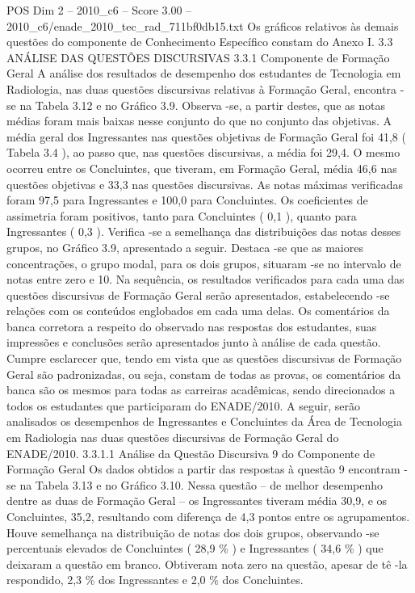 \begin{textsample}{POS Dim 2 – 2010\_c6 – Score 3.00 – 2010\_c6/enade\_2010\_tec\_rad\_711bf0db15.txt}
Os gráficos relativos às demais questões do componente de Conhecimento Específico constam do Anexo I. 3.3 ANÁLISE DAS QUESTÕES DISCURSIVAS 3.3.1 Componente de Formação Geral A análise dos resultados de desempenho dos estudantes de Tecnologia em Radiologia, nas duas questões discursivas relativas à Formação Geral, encontra -se na Tabela 3.12 e no Gráfico 3.9.
Observa -se, a partir destes, que as notas médias foram mais baixas nesse conjunto do que no conjunto das objetivas.
A média geral dos Ingressantes nas questões objetivas de Formação Geral foi 41,8 ( Tabela 3.4 ), ao passo que, nas questões discursivas, a média foi 29,4.
O mesmo ocorreu entre os Concluintes, que tiveram, em Formação Geral, média 46,6 nas questões objetivas e 33,3 nas questões discursivas.
As notas máximas verificadas foram 97,5 para Ingressantes e 100,0 para Concluintes.
Os coeficientes de assimetria foram positivos, tanto para Concluintes ( 0,1 ), quanto para Ingressantes ( 0,3 ).
Verifica -se a semelhança das distribuições das notas desses grupos, no Gráfico 3.9, apresentado a seguir.
Destaca -se que as maiores concentrações, o grupo modal, para os dois grupos, situaram -se no intervalo de notas entre zero e 10.
Na sequência, os resultados verificados para cada uma das questões discursivas de Formação Geral serão apresentados, estabelecendo -se relações com os conteúdos englobados em cada uma delas.
Os comentários da banca corretora a respeito do observado nas respostas dos estudantes, suas impressões e conclusões serão apresentados junto à análise de cada questão.
Cumpre esclarecer que, tendo em vista que as questões discursivas de Formação Geral são padronizadas, ou seja, constam de todas as provas, os comentários da banca são os mesmos para todas as carreiras acadêmicas, sendo direcionados a todos os estudantes que participaram do ENADE/2010.
A seguir, serão analisados os desempenhos de Ingressantes e Concluintes da Área de Tecnologia em Radiologia nas duas questões discursivas de Formação Geral do ENADE/2010. 3.3.1.1 Análise da Questão Discursiva 9 do Componente de Formação Geral Os dados obtidos a partir das respostas à questão 9 encontram -se na Tabela 3.13 e no Gráfico 3.10.
Nessa questão – de melhor desempenho dentre as duas de Formação Geral – os Ingressantes tiveram média 30,9, e os Concluintes, 35,2, resultando com diferença de 4,3 pontos entre os agrupamentos.
Houve semelhança na distribuição de notas dos dois grupos, observando -se percentuais elevados de Concluintes ( 28,9 \% ) e Ingressantes ( 34,6 \% ) que deixaram a questão em branco.
Obtiveram nota zero na questão, apesar de tê -la respondido, 2,3 \% dos Ingressantes e 2,0 \% dos Concluintes.

\end{textsample}
